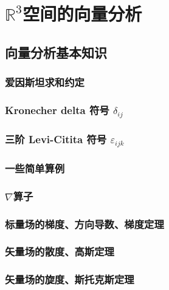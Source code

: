 \chapter{\texorpdfstring{$\mathbb{R}^3$空间的向量分析}{R3空间的向量分析}} %


\section{向量分析基本知识}

\subsection{爱因斯坦求和约定}

\subsection{\texorpdfstring{Kronecher delta 符号 $\delta_{ij} $}{Kronecher delta 符号 }}

\subsection{\texorpdfstring{三阶 Levi-Citita 符号 $\varepsilon_{ijk} $}{三阶 Levi-Citita 符号 }}

\subsection{一些简单算例}

\subsection{\texorpdfstring{$\nabla$算子}{nabla算子}}

\subsection{标量场的梯度、方向导数、梯度定理}

\subsection{矢量场的散度、高斯定理}

\subsection{矢量场的旋度、斯托克斯定理}

